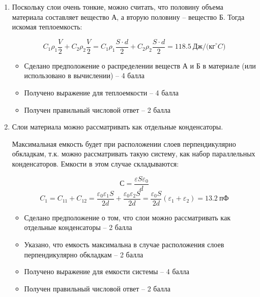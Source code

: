 \solutionSection

\begin{enumerate}
    \item Поскольку слои очень тонкие, можно считать, что половину объема материала составляет вещество А, а вторую половину – вещество Б. Тогда искомая теплоемкость:
    
    $$C_1 \rho_1  \frac{V}{2}+C_2 \rho_2  \frac{V}{2}=C_1 \rho_1  \frac{S \cdot d}{2}+C_2 \rho_2 \frac{S \cdot d}{2}=118.5 \: \text{Дж/(кг}^\circ C)$$


    \markSection

    \begin{itemize}
        \item Сделано предположение о распределении веществ А и Б в материале (или использовано в вычислении) – 4 балла
        \item Получено выражение для теплоемкости – 4 балла
        \item Получен правильный числовой ответ – 2 балла
    \end{itemize}

    \item Слои материала можно рассматривать как отдельные конденсаторы. 
    
    Максимальная емкость будет при расположении слоев перпендикулярно обкладкам, т.к. можно рассматривать такую систему, как набор параллельных конденсаторов. Емкости в этом случае складываются:

    $$С=\frac{\varepsilon S\varepsilon_0}{d}$$
    $$C_1=C_{11}+C_{12}=\frac{\varepsilon_0 \varepsilon_1 S}{2d}+\frac{\varepsilon_0 \varepsilon_2 S}{2d}=\frac{\varepsilon_0 S}{2d} (\varepsilon_1+\varepsilon_2 )=13.2 \: \text{пФ}$$


    \markSection

    \begin{itemize}
        \item Сделано предположение о том, что слои можно рассматривать как отдельные конденсаторы – 2 балла
        \item Указано, что емкость максимальна в случае расположения слоев перпендикулярно обкладкам – 2 балла
        \item Получено выражение для емкости системы – 4 балла
        \item Получен правильный числовой ответ – 2 балла
    \end{itemize}


\end{enumerate}
